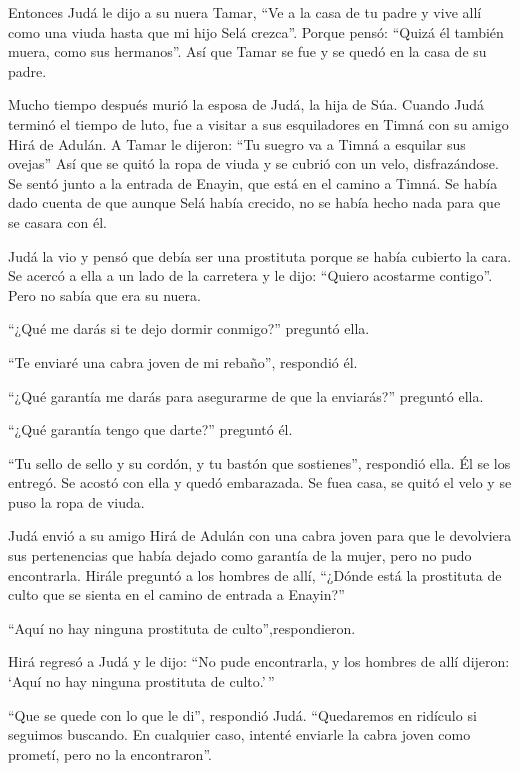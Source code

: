  Entonces Judá le dijo a su nuera Tamar, ``Ve a la casa de
tu padre y vive allí como una viuda hasta que mi hijo Selá crezca''.
Porque pensó: ``Quizá él también muera, como sus hermanos''. Así que
Tamar se fue y se quedó en la casa de su padre.

 Mucho tiempo después murió la esposa de Judá, la hija de
Súa. Cuando Judá terminó el tiempo de luto, fue a visitar a sus
esquiladores en Timná con su amigo Hirá de Adulán.  A Tamar
le dijeron: ``Tu suegro va a Timná a esquilar sus ovejas'' 
Así que se quitó la ropa de viuda y se cubrió con un velo,
disfrazándose. Se sentó junto a la entrada de Enayin, que está en el
camino a Timná. Se había dado cuenta de que aunque Selá había crecido,
no se había hecho nada para que se casara con él.

 Judá la vio y pensó que debía ser una prostituta porque se
había cubierto la cara.  Se acercó a ella a un lado de la
carretera y le dijo: ``Quiero acostarme contigo''. Pero no sabía que era
su nuera.

``¿Qué me darás si te dejo dormir conmigo?'' preguntó ella.

 ``Te enviaré una cabra joven de mi rebaño'', respondió él.

``¿Qué garantía me darás para asegurarme de que la enviarás?'' preguntó
ella.

 ``¿Qué garantía tengo que darte?'' preguntó él.

``Tu sello de sello y su cordón, y tu bastón que sostienes'', respondió
ella. Él se los entregó. Se acostó con ella y quedó embarazada.
 Se fuea casa, se quitó el velo y se puso la ropa de viuda.

 Judá envió a su amigo Hirá de Adulán con una cabra joven
para que le devolviera sus pertenencias que había dejado como garantía
de la mujer, pero no pudo encontrarla.  Hirále preguntó a
los hombres de allí, ``¿Dónde está la prostituta de culto que se sienta
en el camino de entrada a Enayin?''

``Aquí no hay ninguna prostituta de culto'',respondieron.

 Hirá regresó a Judá y le dijo: ``No pude encontrarla, y
los hombres de allí dijeron: `Aquí no hay ninguna prostituta de
culto.'\,''

 ``Que se quede con lo que le di'', respondió Judá.
``Quedaremos en ridículo si seguimos buscando. En cualquier caso,
intenté enviarle la cabra joven como prometí, pero no la encontraron''.


